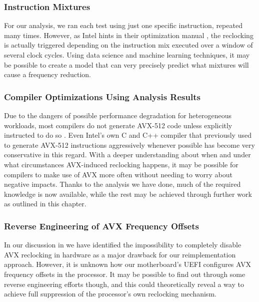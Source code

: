 \subsubsection{Instruction Mixtures}
\label{sec:conclusion:futurework:mixtures}

For our analysis, we ran each test using just one specific instruction, repeated many times. However, as Intel hints in their optimization manual \cite{inteloptimizationmanual}, the reclocking is actually triggered depending on the instruction mix executed over a window of several clock cycles. Using data science and machine learning techniques, it may be possible to create a model that can very precisely predict what mixtures will cause a frequency reduction.

\subsubsection{Compiler Optimizations Using Analysis Results}
\label{sec:conclusion:futurework:compiler}

Due to the dangers of possible performance degradation for heterogeneous workloads, most compilers do not generate \gls{AVX-512} code unless explicitly instructed to do so \cite{lemire2018avx512}. Even Intel's own C and C++ compiler that previously used to generate \gls{AVX-512} instructions aggressively whenever possible has become very conservative in this regard. With a deeper understanding about when and under what circumstances \gls{AVX}-induced reclocking happens, it may be possible for compilers to make use of \gls{AVX} more often without needing to worry about negative impacts. Thanks to the analysis we have done, much of the required knowledge is now available, while the rest may be achieved through further work as outlined in this chapter.

\subsubsection{Reverse Engineering of AVX Frequency Offsets}
\label{sec:conclusion:futurework:reversing}

In our discussion in  we have identified the impossibility to completely disable \gls{AVX} reclocking in hardware as a major drawback for our reimplementation approach. However, it is unknown how our motherboard's \gls{UEFI} configures \gls{AVX} frequency offsets in the processor. It may be possible to find out through some reverse engineering efforts though, and this could theoretically reveal a way to achieve full suppression of the processor's own reclocking mechanism.

